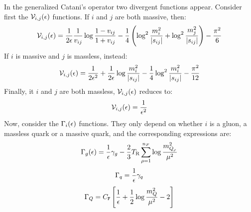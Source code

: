 In the generalized Catani's operator  two divergent functions appear. Consider first the $ \mathcal{V}_{i,j}(\epsilon) $ functions. If $ i $ and $ j $ are both massive, then:
\begin{equation}
  \mathcal{V}_{i,j}(\epsilon) = \frac{1}{2\epsilon} \frac{1}{v_{ij}} \log \frac{1 - v_{ij}}{1 + v_{ij}} - \frac{1}{4} \left( \log^2 \frac{m_i^2}{\left\lvert s_{ij}\right\rvert} + \log^2 \frac{m_j^2}{\left\lvert s_{ij}\right\rvert} \right) - \frac{\pi^2}{6}
  \label{eq:n-mm}
\end{equation}
If $ i $ is massive and $ j $ is massless, instead:
\begin{equation}
  \mathcal{V}_{i,j}(\epsilon) = \frac{1}{2\epsilon^2} + \frac{1}{2\epsilon} \log \frac{m_i^2}{\left\lvert s_{ij}\right\rvert} - \frac{1}{4} \log^2 \frac{m_i^2}{\left\lvert s_{ij}\right\rvert} - \frac{\pi^2}{12}
  \label{eq:n-mnm}
\end{equation}
Finally, it $ i $ and $ j $ are both massless, $ \mathcal{V}_{i,j}(\epsilon) $ reduces to:
\begin{equation}
  \mathcal{V}_{i,j}(\epsilon) = \frac{1}{\epsilon^2}
  \label{eq:n-nmnm}
\end{equation}
Now, consider the $ \Gamma_i(\epsilon) $ functions. They only depend on whether $ i $ is a gluon, a massless quark or a massive quark, and the corresponding expressions are:
\begin{equation}
  \Gamma_g(\epsilon) = \frac{1}{\epsilon} \gamma_g - \frac{2}{3} T_\text{R} \sum_{\rho = 1}^{n_F} \log \frac{m_{Q_\rho}^2}{\mu^2}
  \label{eq:g-g}
\end{equation}
\begin{equation}
  \Gamma_q = \frac{1}{\epsilon} \gamma_q
  \label{eq:g-q}
\end{equation}
\begin{equation}
  \Gamma_Q = C_\mathtt{F} \left[ \frac{1}{\epsilon} + \frac{1}{2} \log \frac{m_Q^2}{\mu^2} - 2 \right]
  \label{eq:g-qm}
\end{equation}











